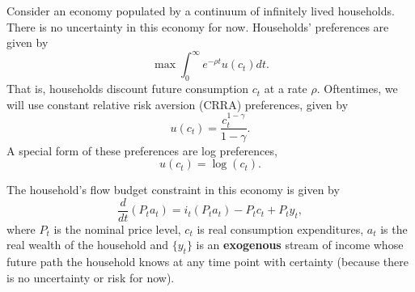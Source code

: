 \documentclass[11pt]{extarticle}
\theoremstyle{plain}
\theoremstyle{definition}
\begin{document}
Consider an economy populated by a continuum of infinitely lived households. There is no uncertainty in this economy for now. Households' preferences are given by
\begin{equation*}
	\max \int_0^\infty e^{-\rho t} u(c_t) dt.
\end{equation*}
That is, households discount future consumption $c_t$ at a rate $\rho$. Oftentimes, we will use constant relative risk aversion (CRRA) preferences, given by
\begin{equation*}
	u(c_t) = \frac{c_t^{1-\gamma}}{1-\gamma}.
\end{equation*}
A special form of these preferences are log preferences, 
\begin{equation*}
	u(c_t) = \log(c_t). 
\end{equation*}


The household's flow budget constraint in this economy is given by
\begin{equation*}
	\frac{d}{dt}(P_t a_t) = i_t (P_t a_t) - P_t c_t + P_t y_t,
\end{equation*}
where $P_t$ is the nominal price level, $c_t$ is real consumption expenditures, $a_t$ is the real wealth of the household and $\{y_t\}$ is an \textbf{exogenous} stream of income whose future path the household knows at any time point with certainty (because there is no uncertainty or risk for now).
\end{document}
